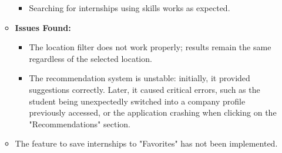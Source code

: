 \begin{itemize}
\begin{itemize}
\begin{itemize}
            \item Searching for internships using skills works as expected.
        \end{itemize}
        \item \textbf{Issues Found:}
        \begin{itemize}
            \item The location filter does not work properly; results remain the same regardless of the selected location.
            \item The recommendation system is unstable: initially, it provided suggestions correctly. Later, it caused critical errors, such as the student being unexpectedly switched into a company profile previously accessed, or the application crashing when clicking on the "Recommendations" section.
        \end{itemize}
        \item The feature to save internships to "Favorites" has not been implemented.
    \end{itemize}

\end{itemize}


